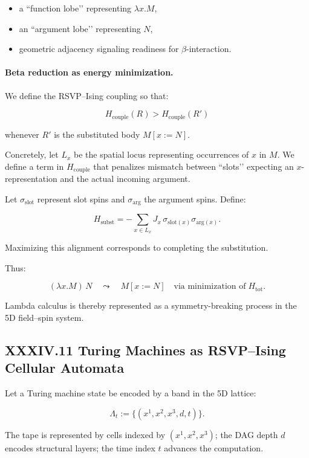 \documentclass[12pt,letterpaper]{article}
\begin{document}
\begin{itemize}
    \item a ``function lobe’’ representing $\lambda x.M$,
    \item an ``argument lobe’’ representing $N$,
    \item geometric adjacency signaling readiness for $\beta$-interaction.
\end{itemize}

\paragraph{Beta reduction as energy minimization.}
We define the RSVP–Ising coupling so that:

\[
H_{\text{couple}}(R) > H_{\text{couple}}(R')
\]

whenever $R'$ is the substituted body $M[x:=N]$.

Concretely, let $L_x$ be the spatial locus representing occurrences of $x$ in $M$. We define a term in $H_{\text{couple}}$ that penalizes mismatch between ``slots’’ expecting an $x$-representation and the actual incoming argument.

Let $\sigma_{\text{slot}}$ represent slot spins and $\sigma_{\text{arg}}$ the argument spins. Define:

\[
H_{\text{subst}} = -\sum_{x\in L_x} J_x\, \sigma_{\text{slot}(x)} \sigma_{\text{arg}(x)}.
\]

Maximizing this alignment corresponds to completing the substitution.

Thus:

\[
(\lambda x. M)\,N 
\quad\leadsto\quad
M[x:=N]
\quad\text{via minimization of}\; H_{\text{tot}}.
\]

Lambda calculus is thereby represented as a symmetry-breaking process in the 5D field–spin system.

\subsection{XXXIV.11 Turing Machines as RSVP–Ising Cellular Automata}

Let a Turing machine state be encoded by a band in the 5D lattice:

\[
\Lambda_{t} := \{(x^1,x^2,x^3,d,t)\}.
\]

The tape is represented by cells indexed by $(x^1,x^2,x^3)$; the DAG depth $d$ encodes structural layers; the time index $t$ advances the computation.
\end{document}
